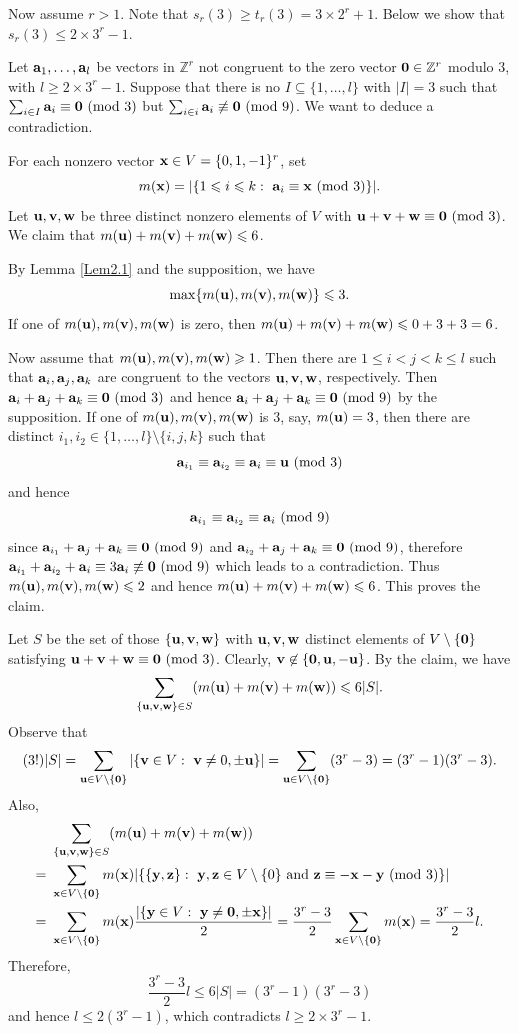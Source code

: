 \documentclass[11pt,reqno]{amsart}
\def\pmod #1{\ ({\rm{mod}}\ #1)}
\def\Z{\mathbb Z}
\def\t{\text}
\def\f{\frac}
\def\ls{\leqslant}
\def\gs{\geqslant}
\def\se {\subseteq}
\def\sm{\setminus}
\def\eq{\equiv}
\theoremstyle{plain}
\theoremstyle{definition}
\theoremstyle{remark}
\begin{document}
Now assume $r>1$. Note that $s_r(3)\gs t_r(3)=3\times 2^r+1$. 
Below we show that $s_r(3)\ls 2\times 3^r-1$. 

 Let ${\bf a}_1,\ldots,{\bf a}_l$ be vectors in $\Z^r$
not congruent to the zero vector ${\bf 0}\in\Z^r$ modulo $3$, with
$l\gs 2\times 3^r-1$. 
Suppose that there is no $I\se\{1,\ldots,l\}$ with $|I|=3$ such that $\sum_{i\in I}{\bf a}_i
\eq{\bf 0}\pmod 3$ but $\sum_{i\in i}{\bf a}_i\not\eq{\bf 0}\pmod 9$. 
We want to deduce a contradiction. 

For each nonzero vector ${\bf x}\in V=\{0,1,-1\}^r$, set
$$m({\bf x})=|\{1\ls i\ls k:\ {\bf a}_i\eq {\bf x}\pmod3\}|.$$
Let ${\bf u},{\bf v},{\bf w}$ be three distinct nonzero elements of $V$
with ${\bf u}+{\bf v}+{\bf w}\eq{\bf 0}\pmod3$. We claim that $m({\bf u})+m({\bf v})+m({\bf w})\ls6$.

By Lemma \ref{Lem2.1} and the supposition, we have
$$\max\{m({\bf u}),m({\bf v}),m({\bf w})\}\ls 3.$$
If one of $m({\bf u}),m({\bf v}),m({\bf w})$ is zero, then
$m({\bf u})+m({\bf v})+m({\bf w})\ls0+3+3=6$. 

Now assume that $m({\bf u}),m({\bf v}),m({\bf w})\gs1$. 
Then there are $1\ls i<j<k\ls l$ such that
${\bf a}_i,{\bf a}_j,{\bf a}_k$ are congruent to the vectors ${\bf u},{\bf v},{\bf w}$, respectively. 
Then ${\bf a}_i+{\bf a}_j+{\bf a}_k\eq{\bf 0}\pmod 3$ and hence
${\bf a}_i+{\bf a}_j+{\bf a}_k\eq{\bf 0}\pmod 9$ by the supposition.
If one of $m({\bf u}),m({\bf v}),m({\bf w})$ is $3$, say, $m({\bf u})=3$, then there are distinct
$i_1,i_2\in\{1,\ldots,l\}\sm\{i,j,k\}$ such that 
$${\bf a}_{i_1}\eq {\bf a}_{i_2}\eq {\bf a}_i\eq {\bf u}\pmod3$$
and hence $${\bf a}_{i_1}\eq{\bf a}_{i_2}\eq {\bf a}_i\pmod 9$$
since ${\bf a}_{i_1}+{\bf a}_j+{\bf a}_k\eq{\bf 0}\pmod 9$ and ${\bf a}_{i_2}+{\bf a}_j+{\bf a}_k\eq{\bf 0}\pmod 9$, therefore ${\bf a}_{i_1}+{\bf a}_{i_2}+{\bf a}_i\eq3{\bf a}_i\not\eq{\bf 0}\pmod 9$ which leads to a contradiction.
Thus $m({\bf u}),m({\bf v}),m({\bf w})\ls2$ and hence $m({\bf u})+m({\bf v})+m({\bf w})\ls6$.
This proves the claim.

Let $S$ be the set of those $\{{\bf u},{\bf v},{\bf w}\}$ with ${\bf u},{\bf v},{\bf w}$
distinct elements of $V\sm\{{\bf 0}\}$ satisfying ${\bf u}+{\bf v}+{\bf w}\eq{\bf 0}\pmod3$.
Clearly, ${\bf v}\not\in\{{\bf 0},{\bf u},-{\bf u}\}$.
By the claim, we have
$$\sum_{\{{\bf u},{\bf v},{\bf w}\}\in S}(m({\bf u})+m({\bf v})+m({\bf w}))\ls 6|S|.$$
Observe that
$$(3!)|S|=\sum_{{\bf u}\in V\sm\{{\bf 0}\}}|\{{\bf v}\in V:\ {\bf v}\not=0,\pm{\bf u}\}|
=\sum_{{\bf u}\in V\sm\{{\bf 0}\}}(3^r-3)=(3^r-1)(3^r-3).$$
Also,
\begin{align*}&\ \sum_{\{{\bf u},{\bf v},{\bf w}\}\in S}(m({\bf u})+m({\bf v})+m({\bf w}))
\\=&\ \sum_{{\bf x}\in V\sm\{{\bf 0}\}}m({\bf x})|\{\{{\bf y},{\bf z}\}:\ {\bf y},{\bf z}\in V\sm\{0\}
\ \t{and}\ {\bf z}\eq -{\bf x}-{\bf y}\pmod3\}|
\\=&\ \sum_{{\bf x}\in V\sm\{{\bf 0}\}}m({\bf x})\f{|\{{\bf y}\in V:\ {\bf y}\not={\bf 0},\pm{\bf x}\}|}2=\f{3^r-3}2\sum_{{\bf x}\in V\sm\{{\bf 0}\}}m({\bf x})=\f{3^r-3}2l.
\end{align*}
Therefore,
$$\f{3^r-3}2l\ls 6|S|=(3^r-1)(3^r-3)$$
and hence $l\ls 2(3^r-1)$, which contradicts $l\gs 2\times3^r-1$.
\end{document}
